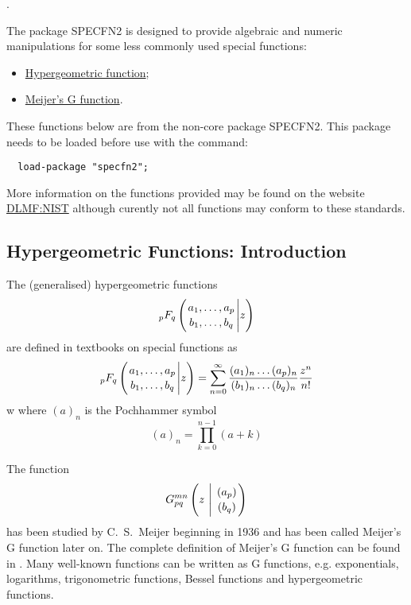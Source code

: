\hypertarget{SPECFNS2}{}.

The package SPECFN2 is designed to provide algebraic and numeric manipulations
for some less commonly used special functions:
\begin{itemize}
\item \hyperlink{HYPERGEOMETRIC}{Hypergeometric function};
\item \hyperlink{MEIJERG}{Meijer's G function}.
\end{itemize}

These functions below are from the non-core package SPECFN2. This package
needs to be loaded before use with the command:
\begin{verbatim}
  load-package "specfn2";
\end{verbatim}

More information on the functions provided may be found on the website
\href{https://dlmf.nist.gov/}{DLMF:NIST} although curently not all functions
may conform to these standards.

\subsection{Hypergeometric Functions: Introduction}
The (generalised) hypergeometric functions
\begin{displaymath}
_pF_q \left( \genfrac{}{}{0pt}{}{a_1, \ldots , a_p}{b_1, \ldots ,b_q} \Bigg\vert z \right)
\end{displaymath}
are defined in textbooks on special functions as
\begin{displaymath}
_pF_q \left( \genfrac{}{}{0pt}{}{a_1, \ldots , a_p}{b_1, \ldots ,b_q} \Bigg\vert z \right)
  = \sum_{n=0}^{\infty}\frac{(a_{1})_{n}\dots(a_{p})_{n}}{(b_{1})_{n}\dots(b_{q})_{n}}\frac{z^{n}}{n!}
\end{displaymath}w
where $(a)_{n}$ is the Pochhammer symbol
\begin{displaymath}
 (a)_{n} = \prod_{k=0}^{n-1} (a+k)
\end{displaymath}

The function 
\begin{displaymath}
G_{p q}^{m n} \left( z \  \Bigg\vert \  \genfrac{}{}{0pt}{}{(a_p)}{(b_q)} \right)
\end{displaymath}
has been studied by C.~S.~Meijer beginning in 1936 and has been
called Meijer's G function later on. The complete definition of Meijer's
G function can be found in \cite{Prudnikov:90c}.
Many well-known functions can be written as G functions,
e.g. exponentials, logarithms, trigonometric functions, Bessel functions
and hypergeometric functions.

